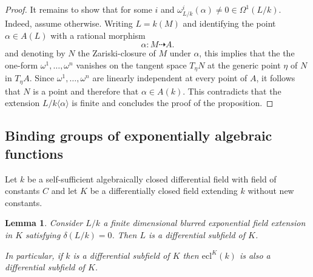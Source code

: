 \documentclass[12pt]{amsart}
\theoremstyle{definition}
\theoremstyle{plain}
\newtheorem{lem}[defn]{Lemma}
\theoremstyle{exampstyle}\newtheorem{thmx}{Theorem}
\theoremstyle{exampstyle}\newtheorem{thmxbis}{Theorem}
\begin{document}
\begin{proof}
It remains to show that for some $i$ and $\omega^i_{L/k}(\alpha) \neq 0 \in \Omega^1(L/k)$. Indeed, assume otherwise. Writing $L = k(M)$ and identifying the point $\alpha \in A(L)$ with a rational morphism
$$ \alpha: M \dashrightarrow A.$$
and denoting by $N$ the Zariski-closure of $M$ under $\alpha$, this implies that the the one-form $\omega^1,\ldots, \omega^n$ vanishes on the tangent space $T_\eta N$ at the generic point $\eta$ of $N$ in $T_\eta A$. Since $\omega^1,\ldots, \omega^n$ are linearly independent at every point of $A$, it follows that $N$ is a point and therefore that $\alpha \in A(k)$. This contradicts that the extension $L/k\langle \alpha \rangle$ is finite and concludes the proof of the proposition.
\end{proof}





\subsection{Binding groups of exponentially algebraic functions} Let $k$ be a self-sufficient algebraically closed  differential field with field of constants $C$ and let $K$ be a differentially closed field extending $k$ without new constants.


 
\begin{lem} \label{lemma-derivation}
Consider $L/k$ a finite dimensional blurred exponential field extension in $K$ satisfying $\delta(L/k) = 0$. Then  $L$ is a differential subfield of $K$.

\noindent In particular, if $k$ is a differential subfield of $K$ then $\mathrm{ecl}^K(k)$ is also a differential subfield of $K$.
\end{lem}
\end{document}
